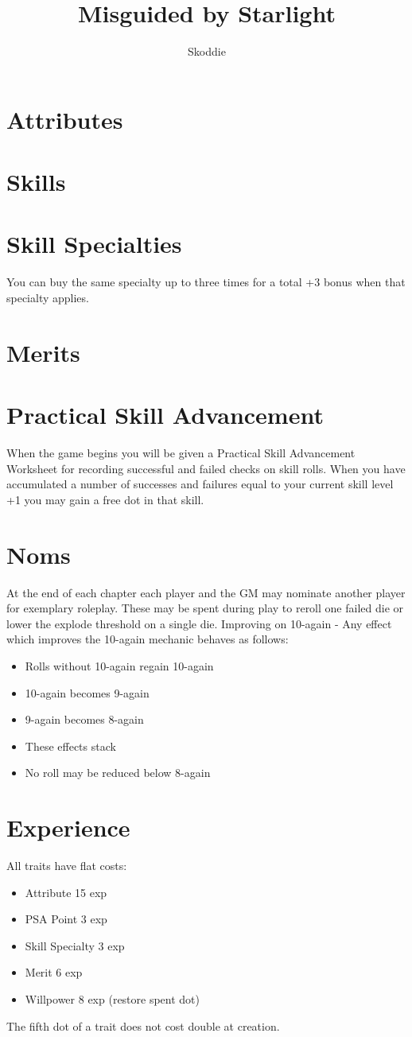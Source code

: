 \documentclass{article}
\title{Misguided by Starlight}
\author{Skoddie}
\begin{document}
\maketitle

\tableofcontents

\section{Attributes}

	

\section{Skills}

	

\section{Skill Specialties}
You can buy the same specialty up to three times for a total +3 bonus when that specialty applies.

\section{Merits}

	

\section{Practical Skill Advancement}
When the game begins you will be given a Practical Skill Advancement Worksheet for recording successful and failed checks on skill rolls. When you have accumulated a number of successes and failures equal to your current skill level +1 you may gain a free dot in that skill.

\section{Noms}
At the end of each chapter each player and the GM may nominate another player for exemplary roleplay. These may be spent during play to reroll one failed die or lower the explode threshold on a single die.
Improving on 10-again
- Any effect which improves the 10-again mechanic behaves as follows:
\begin{itemize}
	\item Rolls without 10-again regain 10-again
	\item 10-again becomes 9-again
	\item 9-again becomes 8-again
	\item These effects stack
	\item No roll may be reduced below 8-again
\end{itemize}

\section{Experience}
All traits have flat costs:
\begin{itemize}
	\item Attribute 15 exp
	\item PSA Point 3 exp
	\item Skill Specialty 3 exp
	\item Merit 6 exp
	\item Willpower 8 exp (restore spent dot)
\end{itemize}
The fifth dot of a trait does not cost double at creation.
\end{document}
